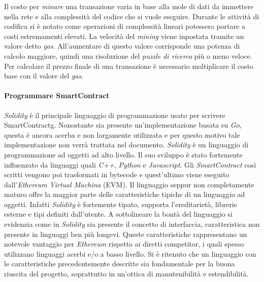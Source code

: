 \medskip
Il costo per \emph{minare} una transazione varia in base alla mole di dati da immettere nella rete e alla complessità del codice che si vuole eseguire. Durante le attività di codifica si è notato come operazioni di complessità lineari potessero portare a costi estremamenti elevati. 
La velocità del \emph{mining} viene inpostata tramite un valore detto \emph{gas}. All'aumentare di questo valore corrisponde una potenza di calcolo maggiore, quindi una risoluzione del \emph{puzzle di ricerca} più o meno veloce. 
Per calcolare il prezzo finale di una transazione è necessario moltiplicare il costo base con il valore del \emph{gas}.

\paragraph{Programmare SmartContract}
\emph{Solidity} è il principale linguaggio di programmazione usato per scrivere \gls{SmartContractg}. Nonostante sia presente un’implementazione basata su \emph{Go}, questa è ancora acerba e non largamente utilizzata e per questo motivo tale implementazione non verrà trattata nel documento.
\emph{Solidity} è un linguaggio di programmazione ad oggetti ad alto livello. Il suo sviluppo è stato fortemente influenzato da linguaggi quali \emph{C++}, \emph{Python} e \emph{Javascript}. Gli \emph{SmartContract} così scritti vengono poi trasformati in bytecode e quest’ultimo viene eseguito dall’\emph{Ethereum Virtual Machina} (EVM).
Il linguaggio seppur non completamente maturo offre la maggior parte delle caratteristiche tipiche di un linguaggio ad oggetti. Infatti \emph{Solidity} è fortemente tipato, supporta l’ereditarietà, librerie esterne e tipi definiti dall’utente. A sottolineare la bontà del linguaggio si evidenzia come in \emph{Solidity} sia presente il concetto di interfaccia, caratteristica non presente in linguaggi ben più longevi. 
Queste caratteristiche rappresentano un notevole vantaggio per \emph{Ethereum} rispetto ai diretti competitor, i quali spesso utilizzano linguaggi acerbi e/o a basso livello. Si è ritenuto che un linguaggio con le caratteristiche precedentemente descritte sia fondamentale per la buona riuscita del progetto, soprattutto in un’ottica di manutenibilità e estendibilità.
